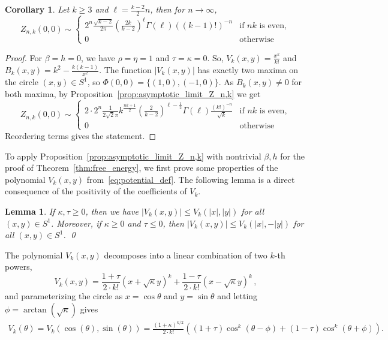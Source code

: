 \documentclass{article}
\numberwithin{theorem}{section}
\newtheorem{corollary}[theorem]{Corollary}
\newtheorem{lemma}[theorem]{Lemma}
\theoremstyle{remark}
\begin{document}
\begin{corollary}
\label{cor:normalization}
Let $k\geq 3$ and $\ell = \frac{k-2}{2} n$, then for $n\rightarrow \infty$,
\[
  Z_{n,k} (0,0) \sim 
  \left\{\begin{array}{ll}
    2^{n}\frac{\sqrt{k-2}}{2\pi} \left( \frac{2k}{k-2} \right)^{\ell} \Gamma(\ell) ((k-1)!)^{-n} & \text{if } nk \text{ is even}, \\
    0 & \text{otherwise}\, 
  \end{array}\right.
\]
\end{corollary}

\begin{proof}
For $\beta = h = 0$, we have $\rho = \eta =1$ and $\tau = \kappa =0$. So, $V_k(x,y)= \frac{x^k}{k!}$ and $B_k(x,y) = k^2 - \frac{k(k-1)}{x^2}$.
The function $|V_k(x,y)|$ has exactly two maxima on the circle $(x,y) \in S^1$, so $\Phi(0,0) = \{ (1,0), (-1,0) \}$. As $B_k(x,y) \neq 0$ for both maxima, by Proposition~\ref{prop:asymptotic_limit_Z_n,k} we get
\[
  Z_{n,k} (0,0) \sim 
  \left\{\begin{array}{ll}
    2 \cdot 
    2^{n}\frac{1}{2\sqrt{2}\pi} k^{\frac{nk+ 1}{2}} \left( \frac{2}{k-2} \right)^{\ell-\frac{1}{2}} \Gamma(\ell) \frac{(k!)^{-n}}{\sqrt{k}} & \text{if } nk \text{ is even}, \\
    0 & \text{otherwise}
  \end{array}\right.
\]
Reordering terms gives the statement.
\end{proof}

To apply Proposition~\ref{prop:asymptotic_limit_Z_n,k} with nontrivial $\beta,h$ for the proof of Theorem~\ref{thm:free_energy}, we first prove some properties of the polynomial $V_k(x,y)$ from~\eqref{eq:potential_def}.
The following lemma is a direct consequence of the positivity of the coefficients of $V_k$.
\begin{lemma}
\label{lmm:positiveVk}
If $\kappa, \tau \geq 0$, then we have $|V_k(x,y)| \leq V_k(|x|, |y|)$ for all $(x,y) \in S^1$.
Moreover, if $\kappa \geq 0$ and $\tau \leq 0$, then $|V_k(x,y)|  \leq V_k(|x|,-|y|)$ for all $(x,y) \in S^1$. \qed
\end{lemma}
The polynomial $V_k(x,y)$ decomposes into a linear combination of two $k$-th powers,
\[
  V_k(x,y) = \frac{1+\tau}{2\cdot k!} (x + \sqrt{\kappa} y)^k + \frac{1-\tau}{2\cdot k!} (x - \sqrt{\kappa}y)^k\,,
\]
and parameterizing the circle as $x = \cos\theta$ and $y = \sin\theta$ and letting $\phi = \arctan(\sqrt{\kappa})$ gives
\begin{align*}
  V_k(\theta) = V_k(\cos(\theta),\sin(\theta)) = \frac{(1+\kappa)^{k/2}}{2\cdot k!}\left( (1+\tau)\cos^k(\theta - \phi) + (1-\tau)\cos^k(\theta + \phi) \right).
\end{align*}
\end{document}
